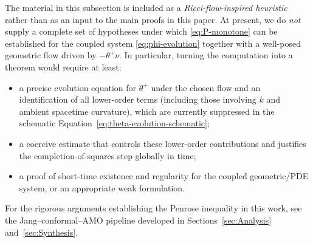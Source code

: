 \begin{remark}
\label{rem:P-functional-status}
The material in this subsection is included as a \emph{Ricci-flow-inspired heuristic} rather than as an input to the main proofs in this paper.
At present, we do \emph{not} supply a complete set of hypotheses under which \eqref{eq:P-monotone} can be established for the coupled system
\eqref{eq:phi-evolution} together with a well-posed geometric flow driven by $-\theta^+\nu$.
In particular, turning the computation into a theorem would require at least:
\begin{itemize}
\item a precise evolution equation for $\theta^+$ under the chosen flow and an identification of all lower-order terms (including those involving $k$ and ambient spacetime curvature), which are currently suppressed in the schematic Equation~\eqref{eq:theta-evolution-schematic};
\item a coercive estimate that controls these lower-order contributions and justifies the completion-of-squares step globally in time;
\item a proof of short-time existence and regularity for the coupled geometric/PDE system, or an appropriate weak formulation.
\end{itemize}
For the rigorous arguments establishing the Penrose inequality in this work, see the Jang--conformal--AMO pipeline developed in Sections~\ref{sec:Analysis} and~\ref{sec:Synthesis}.
\end{remark}

